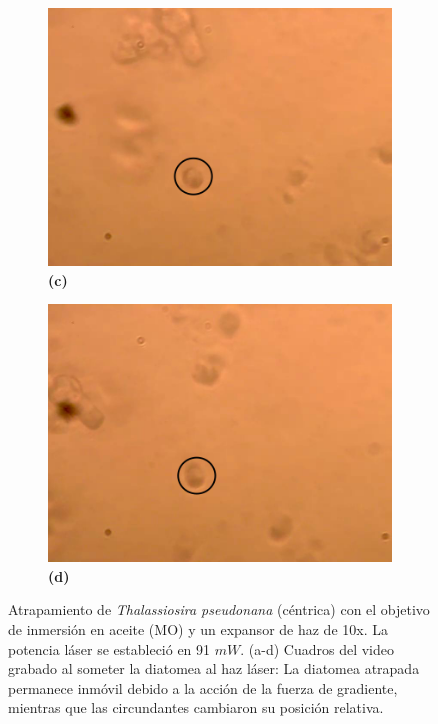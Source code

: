 \documentclass[10pt,aspectratio=1610,compress,dvipsnames]{beamer}
\begin{document}
\begin{frame}
{\begin{figure}
  \begin{subfigure}[b]{0.2\linewidth}
    \includegraphics[width=\linewidth]{Results/ResultsOilpseudonana/op3.png} %
    \caption*{\textbf{(c)}}
    \label{fig7:c}
  \end{subfigure}\hspace{0.5cm} %
  \begin{subfigure}[b]{0.2\linewidth}
    \includegraphics[width=\linewidth]{Results/ResultsOilpseudonana/op4.png} %
    \caption*{\textbf{(d)}}
    \label{fig7:d}
  \end{subfigure}
  \caption{
Atrapamiento de \textit{Thalassiosira pseudonana} (céntrica) con el objetivo de inmersión en aceite (MO) y un expansor de haz de 10x. La potencia láser se estableció en 91 $mW$. (a-d) Cuadros del video grabado al someter la diatomea al haz láser: La diatomea atrapada permanece inmóvil debido a la acción de la fuerza de gradiente, mientras que las circundantes cambiaron su posición relativa. }
  \label{poresfrustrules}
\end{figure}

}

\end{frame}
\end{document}
